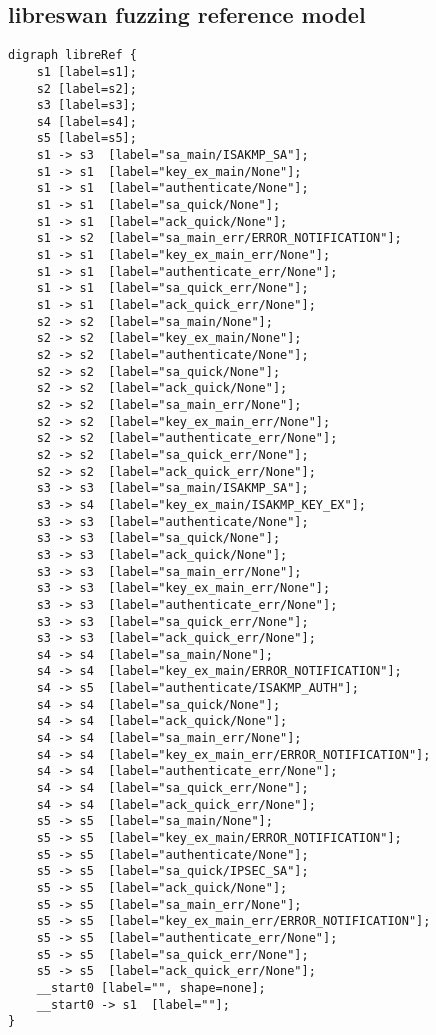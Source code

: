 \subsection*{libreswan fuzzing reference model}
\begin{lstlisting}[numbers=none]
digraph libreRef {
	s1 [label=s1];
	s2 [label=s2];
	s3 [label=s3];
	s4 [label=s4];
	s5 [label=s5];
	s1 -> s3  [label="sa_main/ISAKMP_SA"];
	s1 -> s1  [label="key_ex_main/None"];
	s1 -> s1  [label="authenticate/None"];
	s1 -> s1  [label="sa_quick/None"];
	s1 -> s1  [label="ack_quick/None"];
	s1 -> s2  [label="sa_main_err/ERROR_NOTIFICATION"];
	s1 -> s1  [label="key_ex_main_err/None"];
	s1 -> s1  [label="authenticate_err/None"];
	s1 -> s1  [label="sa_quick_err/None"];
	s1 -> s1  [label="ack_quick_err/None"];
	s2 -> s2  [label="sa_main/None"];
	s2 -> s2  [label="key_ex_main/None"];
	s2 -> s2  [label="authenticate/None"];
	s2 -> s2  [label="sa_quick/None"];
	s2 -> s2  [label="ack_quick/None"];
	s2 -> s2  [label="sa_main_err/None"];
	s2 -> s2  [label="key_ex_main_err/None"];
	s2 -> s2  [label="authenticate_err/None"];
	s2 -> s2  [label="sa_quick_err/None"];
	s2 -> s2  [label="ack_quick_err/None"];
	s3 -> s3  [label="sa_main/ISAKMP_SA"];
	s3 -> s4  [label="key_ex_main/ISAKMP_KEY_EX"];
	s3 -> s3  [label="authenticate/None"];
	s3 -> s3  [label="sa_quick/None"];
	s3 -> s3  [label="ack_quick/None"];
	s3 -> s3  [label="sa_main_err/None"];
	s3 -> s3  [label="key_ex_main_err/None"];
	s3 -> s3  [label="authenticate_err/None"];
	s3 -> s3  [label="sa_quick_err/None"];
	s3 -> s3  [label="ack_quick_err/None"];
	s4 -> s4  [label="sa_main/None"];
	s4 -> s4  [label="key_ex_main/ERROR_NOTIFICATION"];
	s4 -> s5  [label="authenticate/ISAKMP_AUTH"];
	s4 -> s4  [label="sa_quick/None"];
	s4 -> s4  [label="ack_quick/None"];
	s4 -> s4  [label="sa_main_err/None"];
	s4 -> s4  [label="key_ex_main_err/ERROR_NOTIFICATION"];
	s4 -> s4  [label="authenticate_err/None"];
	s4 -> s4  [label="sa_quick_err/None"];
	s4 -> s4  [label="ack_quick_err/None"];
	s5 -> s5  [label="sa_main/None"];
	s5 -> s5  [label="key_ex_main/ERROR_NOTIFICATION"];
	s5 -> s5  [label="authenticate/None"];
	s5 -> s5  [label="sa_quick/IPSEC_SA"];
	s5 -> s5  [label="ack_quick/None"];
	s5 -> s5  [label="sa_main_err/None"];
	s5 -> s5  [label="key_ex_main_err/ERROR_NOTIFICATION"];
	s5 -> s5  [label="authenticate_err/None"];
	s5 -> s5  [label="sa_quick_err/None"];
	s5 -> s5  [label="ack_quick_err/None"];
	__start0 [label="", shape=none];
	__start0 -> s1  [label=""];
}
\end{lstlisting}
\newpage

